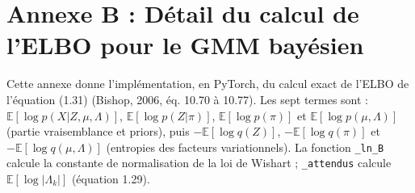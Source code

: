 \section*{Annexe B : Détail du calcul de l'ELBO pour le GMM bayésien}
Cette annexe donne l'implémentation, en PyTorch, du calcul exact de l'ELBO de l'équation (1.31) (Bishop, 2006, éq. 10.70 à 10.77). Les sept termes sont : $\mathbb{E}[\log p(X|Z,\mu ,\Lambda )]$, $\mathbb{E}[\log p(Z|\pi )]$, $\mathbb{E}[\log p(\pi )]$ et $\mathbb{E}[\log p(\mu ,\Lambda )]$ (partie vraisemblance et priors), puis $-\mathbb{E}[\log q(Z)]$, $-\mathbb{E}[\log q(\pi )]$ et $-\mathbb{E}[\log q(\mu ,\Lambda )]$ (entropies des facteurs variationnels). La fonction \texttt{\_ln\_B} calcule la constante de normalisation de la loi de Wishart ; \texttt{\_attendus} calcule $\mathbb{E}[\log |\Lambda _{k}|]$ (équation 1.29).

